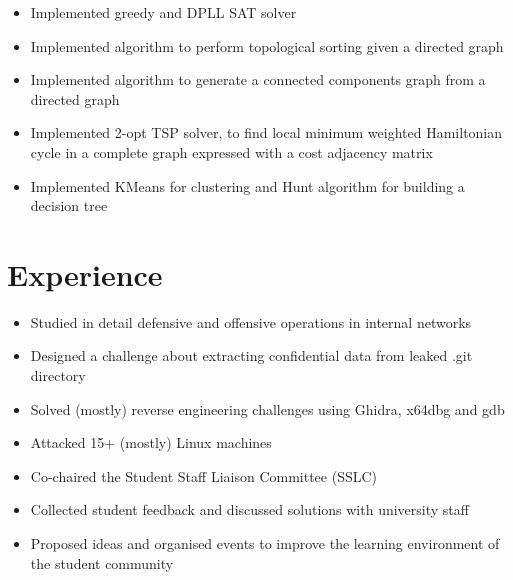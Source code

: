 \documentclass{resume}
\begin{document}
\begin{itemize}
  \item Implemented greedy and DPLL SAT solver
  \item Implemented algorithm to perform topological sorting given a directed graph
  \item Implemented algorithm to generate a connected components graph from a directed graph
  \item Implemented 2-opt TSP solver, to find local minimum weighted Hamiltonian cycle in a complete graph expressed with a cost adjacency matrix
  \item Implemented KMeans for clustering and Hunt algorithm for building a decision tree
\end{itemize}


\section{Experience}
\begin{itemize}
  \item Studied in detail defensive and offensive operations in internal networks
\end{itemize}

\begin{itemize}
  \item Designed a challenge about extracting confidential data from leaked .git directory
\end{itemize}

\begin{itemize}
  \item Solved (mostly) reverse engineering challenges using Ghidra, x64dbg and gdb
  \item Attacked 15+ (mostly) Linux machines
\end{itemize}

\begin{itemize}
  \item Co-chaired the Student Staff Liaison Committee (SSLC)
  \item Collected student feedback and discussed solutions with university staff
  \item Proposed ideas and organised events to improve the learning environment of the student community
\end{itemize}
\end{document}
